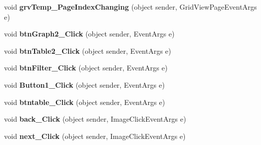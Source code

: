 \begin{DoxyCompactItemize}
\item 
\hypertarget{classusertrackmyhealth__temperature__graph_a57232b58e6d4f41390a6e908351ff11f}{void {\bfseries grv\-Temp\-\_\-\-Page\-Index\-Changing} (object sender, Grid\-View\-Page\-Event\-Args e)}\label{classusertrackmyhealth__temperature__graph_a57232b58e6d4f41390a6e908351ff11f}

\item 
\hypertarget{classusertrackmyhealth__temperature__graph_a071df79be863999cec585f5bcfd20f02}{void {\bfseries btn\-Graph2\-\_\-\-Click} (object sender, Event\-Args e)}\label{classusertrackmyhealth__temperature__graph_a071df79be863999cec585f5bcfd20f02}

\item 
\hypertarget{classusertrackmyhealth__temperature__graph_ac92792c6d84f30e6db5dbb113ab0c3f2}{void {\bfseries btn\-Table2\-\_\-\-Click} (object sender, Event\-Args e)}\label{classusertrackmyhealth__temperature__graph_ac92792c6d84f30e6db5dbb113ab0c3f2}

\item 
\hypertarget{classusertrackmyhealth__temperature__graph_a69cd725e651bfa000e5fd9430121e8b4}{void {\bfseries btn\-Filter\-\_\-\-Click} (object sender, Event\-Args e)}\label{classusertrackmyhealth__temperature__graph_a69cd725e651bfa000e5fd9430121e8b4}

\item 
\hypertarget{classusertrackmyhealth__temperature__graph_a507e535b44bfff55097286b6a20c2a84}{void {\bfseries Button1\-\_\-\-Click} (object sender, Event\-Args e)}\label{classusertrackmyhealth__temperature__graph_a507e535b44bfff55097286b6a20c2a84}

\item 
\hypertarget{classusertrackmyhealth__temperature__graph_a74015065bba07e0ba783042b39aed72b}{void {\bfseries btntable\-\_\-\-Click} (object sender, Event\-Args e)}\label{classusertrackmyhealth__temperature__graph_a74015065bba07e0ba783042b39aed72b}

\item 
\hypertarget{classusertrackmyhealth__temperature__graph_a9257967da655d6c593feef82bc1893f3}{void {\bfseries back\-\_\-\-Click} (object sender, Image\-Click\-Event\-Args e)}\label{classusertrackmyhealth__temperature__graph_a9257967da655d6c593feef82bc1893f3}

\item 
\hypertarget{classusertrackmyhealth__temperature__graph_a5afee8b8daa44f57045fab46ac8ab7a9}{void {\bfseries next\-\_\-\-Click} (object sender, Image\-Click\-Event\-Args e)}\label{classusertrackmyhealth__temperature__graph_a5afee8b8daa44f57045fab46ac8ab7a9}


\end{DoxyCompactItemize}
